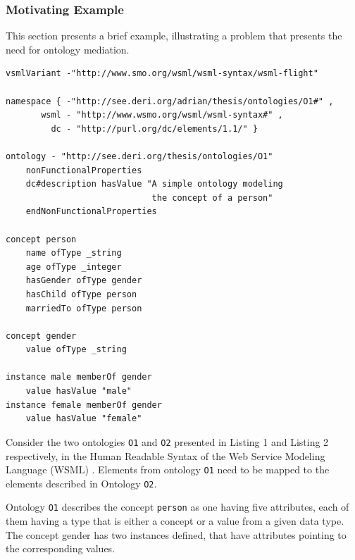 \subsubsection{Motivating Example}
\label{subsec:mediationproblem_motivatingexample}
This section presents a brief example, illustrating a problem that
presents the need for ontology mediation. 

\lstset{emphstyle=\textbf\textit\underbar}
\begin{lstlisting}
vsmlVariant -"http://www.smo.org/wsml/wsml-syntax/wsml-flight"

namespace { -"http://see.deri.org/adrian/thesis/ontologies/O1#" ,
       wsml - "http://www.wsmo.org/wsml/wsml-syntax#" ,
         dc - "http://purl.org/dc/elements/1.1/" }

ontology - "http://see.deri.org/thesis/ontologies/O1"
    nonFunctionalProperties
    dc#description hasValue "A simple ontology modeling
                             the concept of a person"
    endNonFunctionalProperties

concept person
    name ofType _string
    age ofType _integer
    hasGender ofType gender
    hasChild ofType person
    marriedTo ofType person

concept gender
    value ofType _string

instance male memberOf gender
    value hasValue "male"
instance female memberOf gender
    value hasValue "female"
\end{lstlisting}

Consider the two ontologies \texttt{O1} and
\texttt{O2} \cite{mocan2008mediation} presented in Listing 1 and
Listing 2 respectively, in the Human Readable Syntax of the Web Service
Modeling Language (WSML) \cite{debruin2005wsml}. Elements from
ontology \texttt{O1} need to be mapped to the elements
described in Ontology \texttt{O2}. 

Ontology \texttt{O1} describes the concept
\texttt{person} as one having five attributes, each of
them having a type that is either a concept or a value from a given
data type. The concept gender has two instances defined, that have
attributes pointing to the corresponding values. 

